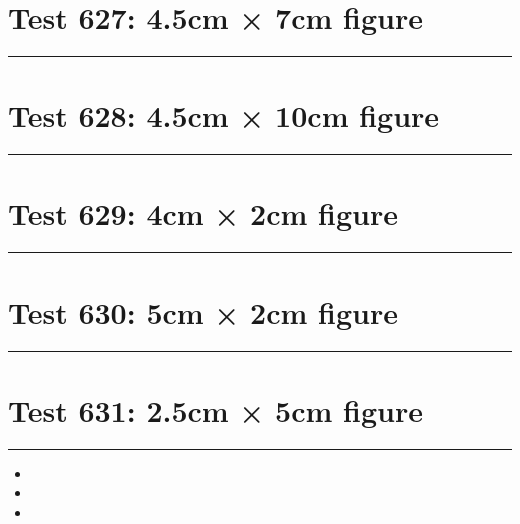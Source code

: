 \documentclass[a4paper,11pt]{article}
\begin{document}
\section*{Test 627: 4.5cm × 7cm figure}
\begin{swarmwrap}%
  \begin{minipage}[t]{4cm}
    \centering
    \rule{\linewidth}{7cm}
  \end{minipage}%
\end{swarmwrap}%
\swarmwrapnext
\lipsum[37]
\lipsum[38]
\lipsum[39]
\lipsum[40]
\section*{Test 628: 4.5cm × 10cm figure}
\begin{swarmwrap}%
  \begin{minipage}[t]{4cm}
    \centering
    \rule{\linewidth}{10cm}
  \end{minipage}%
\end{swarmwrap}%
\swarmwrapnext
\lipsum[49]
\lipsum[50]
\lipsum[51]
\lipsum[52]
\lipsum[53]
\lipsum[54]
\section*{Test 629: 4cm × 2cm figure}
\begin{swarmwrap}%
  \begin{minipage}[t]{4cm}
    \centering
    \rule{\linewidth}{2cm}
  \end{minipage}%
\end{swarmwrap}%
\swarmwrapnext
\lipsum[21]
\lipsum[22]
\lipsum[23]
\section*{Test 630: 5cm × 2cm figure}
\begin{swarmwrap}%
  \begin{minipage}[t]{5cm}
    \centering
    \rule{\linewidth}{2cm}
  \end{minipage}%
\end{swarmwrap}%
\swarmwrapnext
\lipsum[107]
\lipsum[108]
\lipsum[109]
\section*{Test 631: 2.5cm × 5cm figure}
\begin{swarmwrap}%
  \begin{minipage}[t]{2cm}
    \centering
    \rule{\linewidth}{5cm}
  \end{minipage}%
\end{swarmwrap}
\begin{itemize}
  \item \swarmwrapnext\lipsum[39][1-4]
  \item \lipsum[41][1-3]
  \item \lipsum[42][1-3]
\end{itemize}
\end{document}
